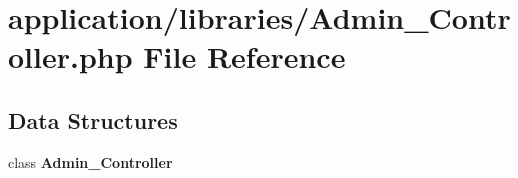 \section{application/libraries/\-Admin\-\_\-\-Controller.php File Reference}
\label{_admin___controller_8php}
\subsection*{Data Structures}
\begin{DoxyCompactItemize}
\item 
class {\bf Admin\-\_\-\-Controller}
\end{DoxyCompactItemize}
